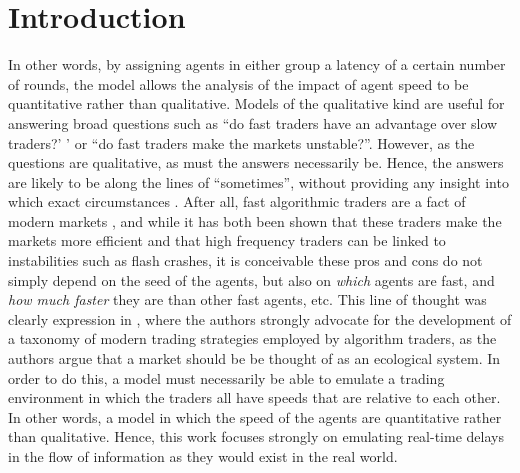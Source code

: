 \part{Introduction}
\begin{comment}
Many models of artificial markets resemble typical game theoretic models in that all trading is round based. Typically all agents receive the market information and evaluate their strategies once every round. Such models are very useful when all agents are more or less equally fast, since it is then reasonable to assume that they have access to the same information. 

The model proposed in this work is different from such models in that it assumes that agents generally do \textit{not} have access to the same information when they evaluate their strategies. 
\end{comment}

In other words, by assigning agents in either group a latency of a certain number of rounds, the model allows the analysis of the impact of agent speed to be quantitative rather than qualitative. Models of the qualitative kind are useful for answering broad questions such as ``do fast traders have an advantage over slow traders?' ' or ``do fast traders make the markets unstable?''. However, as the questions are qualitative, as must the answers necessarily be. Hence, the answers are likely to be along the lines of ``sometimes'', without providing any insight into which exact circumstances . After all, fast algorithmic traders are a fact of modern markets , and while it has both been shown that these traders make the markets more efficient \cite{keylist} and that high frequency traders can be linked to instabilities such as flash crashes, it is conceivable these pros and cons do not simply depend on the seed of the agents, but also on \textit{which} agents are fast, and \textit{how much faster} they are than other fast agents, etc. This line of thought was clearly expression in \cite{farmer2013ecological}, where the authors strongly advocate for the development of a taxonomy of modern trading strategies employed by algorithm traders, as the authors argue that a market should be be thought of as an ecological system. In order to do this, a model must necessarily be able to emulate a trading environment in which the traders all have speeds that are relative to each other. In other words, a model in which the speed of the agents are quantitative rather than qualitative. Hence, this work focuses strongly on emulating real-time delays in the flow of information as they would exist in the real world.


